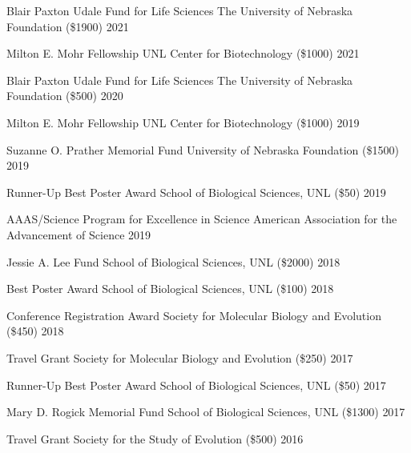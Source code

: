 
\begin{cvhonors}

  \cvhonor
    {Blair Paxton Udale Fund for Life Sciences}
    {The University of Nebraska Foundation (\$1900)}
    {2021}

  \cvhonor
    {Milton E. Mohr Fellowship}
    {UNL Center for Biotechnology (\$1000)}
    {2021}
    
  \cvhonor
    {Blair Paxton Udale Fund for Life Sciences}
    {The University of Nebraska Foundation (\$500)}
    {2020}

  \cvhonor
    {Milton E. Mohr Fellowship}
    {UNL Center for Biotechnology (\$1000)}
    {2019}

  \cvhonor
    {Suzanne O. Prather Memorial Fund}
    {University of Nebraska Foundation (\$1500)}
    {2019}

  \cvhonor
    {Runner-Up Best Poster Award}
    {School of Biological Sciences, UNL (\$50)}
    {2019}

  \cvhonor
    {AAAS/Science Program for Excellence in Science}
    {American Association for the Advancement of Science}
    {2019}

  \cvhonor
    {Jessie A. Lee Fund} 
    {School of Biological Sciences, UNL (\$2000)}
    {2018} %

  \cvhonor
    {Best Poster Award}
    {School of Biological Sciences, UNL (\$100)}
    {2018}

  \cvhonor
    {Conference Registration Award}
    {Society for Molecular Biology and Evolution (\$450)}
    {2018}

  \cvhonor
    {Travel Grant}
    {Society for Molecular Biology and Evolution (\$250)}
    {2017}

  \cvhonor
    {Runner-Up Best Poster Award}
    {School of Biological Sciences, UNL (\$50)}
    {2017}

  \cvhonor
    {Mary D. Rogick Memorial Fund}
    {School of Biological Sciences, UNL (\$1300)}
    {2017}

  \cvhonor
    {Travel Grant}
    {Society for the Study of Evolution (\$500)}
    {2016}


\end{cvhonors}

